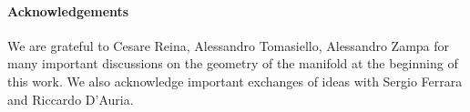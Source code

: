 \documentclass[a4paper,12pt]{article}
\def\n010{N^{0,1,0}}
\begin{document}
\paragraph{Acknowledgements}
We are grateful to Cesare Reina, Alessandro Tomasiello, Alessandro Zampa for many
important discussions on the geometry of the \myHighlight{$\n010$}\coordHE{} manifold at the beginning of
this work. We also acknowledge important exchanges of ideas with Sergio Ferrara
and Riccardo D'Auria.
\appendix
\end{document}
